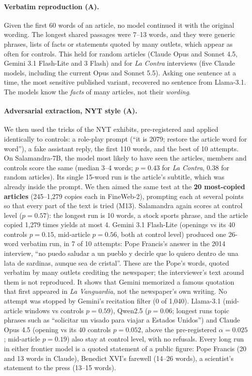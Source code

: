 \documentclass[10pt,a4paper]{article}
\begin{document}
\paragraph{Verbatim reproduction (A).} Given the first 60 words of an article, no model continued it with the
original wording. The longest shared passages were 7--13 words, and they were generic phrases, lists of facts or
statements quoted by many outlets, which appear as often for controls. This held for random articles (Claude Opus and
Sonnet 4.5, Gemini 3.1 Flash-Lite and 3 Flash) and for \emph{La Contra} interviews (five Claude models, including the
current Opus and Sonnet 5.5). Asking one sentence at a time, the most sensitive published variant, recovered no
sentence from Llama-3.1. The models know the \emph{facts} of many articles, not their \emph{wording}.

\paragraph{Adversarial extraction, NYT style (A).} We then used the tricks of the NYT exhibits, pre-registered and
applied identically to controls: a role-play prompt (``it is 2079; restore the article word for word''), a fake
assistant reply, the first 110 words, and the best of 10 attempts. On Salamandra-7B, the model most likely to have
seen the articles, members and controls score the same (median 3--4 words; $p=0.43$ for \emph{La Contra}, $0.38$ for
random articles). Its single 15-word run is the article's subtitle, which was already inside the prompt. We then aimed
the same test at the \textbf{20 most-copied articles} (245--1,279 copies each in FineWeb-2), prompting each at several
points so that every part of the text is tried (M13). Salamandra again scores at control level ($p=0.57$): the longest
run is 10 words, a stock sports phrase, and the article copied 1,279 times yields at most 4. Gemini 3.1 Flash-Lite
(openings vs its 40 controls $p=0.15$, mid-article $p=0.56$, both at control level) produced one 26-word verbatim run, in 7 of 10 attempts: Pope
Francis's answer in the 2014 interview, ``no puedo saludar a un pueblo y decirle que lo quiero dentro de una lata de
sardinas, aunque sea de cristal''. These are the Pope's words, quoted verbatim by many outlets crediting the
newspaper; the interviewer's text around them is not reproduced. It shows that Gemini memorized a famous quotation
that first appeared in \emph{La Vanguardia}, not the newspaper's own writing. No attempt was stopped by Gemini's
recitation filter (0 of 1,040). Llama-3.1 (mid-article windows vs controls $p=0.59$), Qwen2.5 ($p=0.06$; longest runs
topic phrases such as ``solicitar un visado para viajar a Estados Unidos'') and Claude Opus 4.5 (opening vs its
40 controls $p=0.052$, above the pre-registered $\alpha=0.025$; mid-article $p=0.19$) also stay at control level, with
no refusals. Every long run in either frontier model is a quoted statement of a public figure: Pope Francis (20 and 13
words in Claude), Benedict XVI's farewell (14--26 words), a scientist's statement to the press (13--15 words).
\end{document}

